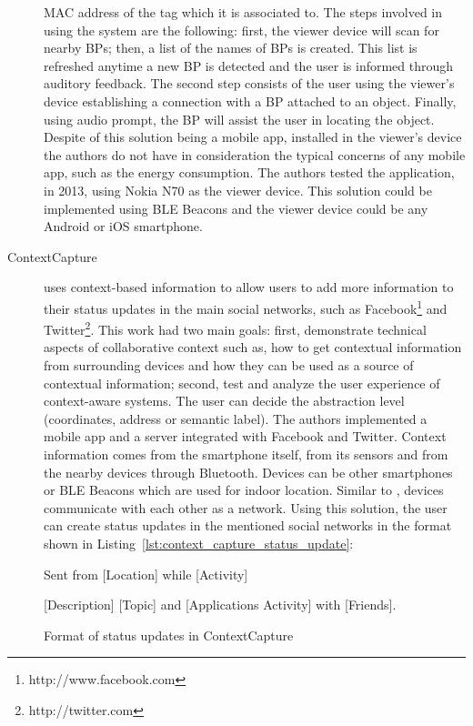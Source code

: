 \begin{description}
  \gls{MAC} address of the tag which it is associated to.
  The steps involved in using the system are the
  following: first, the viewer device will scan
  for nearby \glspl{BP}; then, a list of the names of
  \glspl{BP} is created. This list is refreshed anytime a new
  \gls{BP} is detected and the user is informed through auditory feedback.
  The second step consists of the user using
  the viewer's device establishing a connection with a \gls{BP}
  attached to an object. Finally, using audio prompt, the \gls{BP}
  will assist the user in locating the object.
  Despite of this solution being a mobile app, installed
  in the viewer's device the authors do not have in
  consideration the typical concerns of any mobile app,
  such as the energy consumption.
  The authors tested the application, in 2013,
  using Nokia N70 as the viewer device.
  This solution could be implemented using \gls{BLE} Beacons
  and the viewer device could be any Android or iOS smartphone.
  \item[ContextCapture\cite{Antila2011}]
  uses context-based information to allow users to
  add more information to their status updates
  in the main social networks, such as
  Facebook\footnote{http://www.facebook.com} and
  Twitter\footnote{http://twitter.com}.
  This work had two main goals: first, demonstrate technical
  aspects of collaborative context such as,
  how to get contextual information from
  surrounding devices and how they can be used
  as a source of contextual information;
  second, test and analyze the user experience of
  context-aware systems.
  The user can decide the abstraction level (coordinates,
  address or semantic label).
  The authors implemented a mobile app and a
  server integrated with Facebook and Twitter.
  Context information comes from the smartphone itself,
  from its sensors and from the nearby devices through
  Bluetooth.
  Devices can be other smartphones or \gls{BLE} Beacons which
  are used for indoor location.
  Similar to \cite{BenAbdesslem2014}, devices communicate
  with each other as a network.
  Using this solution, the user can create status updates
  in the mentioned social networks in the format shown in Listing~\ref{lst:context_capture_status_update}:
  \begin{listing}

      Sent from [Location] while [Activity]

      [Description] [Topic] and [Applications Activity] with
      [Friends].
    \caption[ContextCapture update format]{Format of status updates in ContextCapture}
    \label{lst:context_capture_status_update}
  \end{listing}
\end{description}

